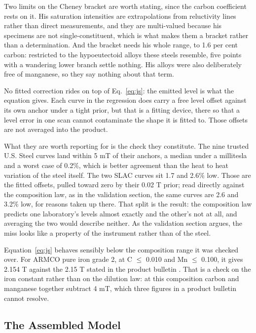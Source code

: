 \documentclass[
  11pt,
]{article}
\begin{document}
Two limits on the Cheney bracket are worth stating, since the carbon coefficient rests on it. His saturation intensities are extrapolations from reluctivity lines rather than direct measurements, and they are multi-valued because his specimens are not single-constituent, which is what makes them a bracket rather than a determination. And the bracket needs his whole range, to 1.6 per cent carbon: restricted to the hypoeutectoid alloys these steels resemble, five points with a wandering lower branch settle nothing. His alloys were also deliberately free of manganese, so they say nothing about that term.

No fitted correction rides on top of Eq.~\eqref{eq:js}: the emitted level is what the equation gives. Each curve in the regression does carry a free level offset against its own anchor under a tight prior, but that is a fitting device, there so that a level error in one scan cannot contaminate the shape it is fitted to. Those offsets are not averaged into the product.

What they are worth reporting for is the check they constitute. The nine trusted U.S. Steel curves land within 5 mT of their anchors, a median under a millitesla and a worst case of 0.2\%, which is better agreement than the heat to heat variation of the steel itself. The two SLAC curves sit 1.7 and 2.6\% low. Those are the fitted offsets, pulled toward zero by their 0.02 T prior; read directly against the composition law, as in the validation section, the same curves are 2.6 and 3.2\% low, for reasons taken up there. That split is the result: the composition law predicts one laboratory's levels almost exactly and the other's not at all, and averaging the two would describe neither. As the validation section argues, the miss looks like a property of the instrument rather than of the steel.

Equation~\eqref{eq:js} behaves sensibly below the composition range it was checked over. For ARMCO pure iron grade 2, at C \(\le\) 0.010 and Mn \(\le\) 0.100, it gives 2.154 T against the 2.15 T stated in the product bulletin \cite{armco-iron}. That is a check on the iron constant rather than on the dilution law: at this composition carbon and manganese together subtract 4 mT, which three figures in a product bulletin cannot resolve.

\subsection{The Assembled Model}\label{the-assembled-model}
\end{document}

